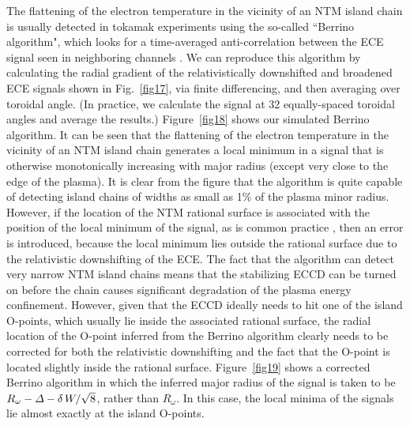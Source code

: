 \documentclass{iopjournal}
\begin{document}
{The flattening of the electron temperature in the vicinity of an NTM island chain is usually detected in tokamak experiments using the so-called ``Berrino algorithm", which looks for
a time-averaged anti-correlation between the ECE signal seen in neighboring channels \cite{ece4}. We can  reproduce this algorithm  by calculating the radial gradient of
the relativistically downshifted and broadened ECE signals shown in Fig.~\ref{fig17}, via finite differencing,  and then averaging over toroidal angle. (In practice, we
calculate the signal at 32 equally-spaced toroidal angles and average the results.) Figure~\ref{fig18} shows our simulated Berrino algorithm. It can be seen that the
flattening of the electron temperature in the vicinity of an NTM island chain generates a local minimum in a signal that is otherwise monotonically increasing with major radius (except very close to
the edge of the plasma). It is clear from the figure that the algorithm is quite capable of detecting island chains of widths as small as 1\% of the plasma minor radius. 
However, if the location of the NTM rational surface is associated with the position of the local minimum of the signal, as is common practice \cite{ece4},  then an error is introduced, because the
local minimum lies outside the rational surface due to the relativistic downshifting of the ECE. The fact that the algorithm can detect very narrow NTM island chains means that the stabilizing ECCD can be turned on before the chain causes significant
degradation of the plasma energy confinement. However, given that the ECCD ideally needs to hit one of the island O-points, which usually lie inside the associated rational 
surface, the radial location of the O-point inferred from the Berrino algorithm clearly needs to be corrected for both the relativistic downshifting and the fact that the O-point
is located slightly inside the rational surface. Figure~\ref{fig19} shows a corrected Berrino algorithm  in which the inferred major
radius of the signal is taken to be $R_\omega-{\mit\Delta}-\delta\,W/\sqrt{8}$, rather than $R_\omega$. In this case, the  local minima of the signals lie almost exactly
at the island O-points. 
 
}
\end{document}
